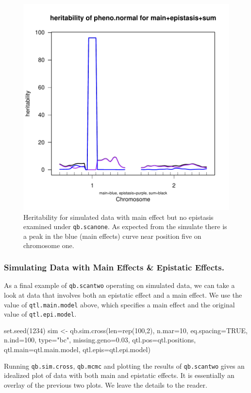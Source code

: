 \documentclass[12pt]{article}
\begin{document}
\begin{figure}
\includegraphics{scanPDF/FIG-Scanone-SimMainLog10}
\caption{Heritability for simulated data with main effect but no epistasis examined 
under {\tt qb.scanone}. As expected from the simulate there is a peak in the 
blue (main effects) curve near position five on chromosome one.}
\label{fig-simnoepimainscanone}
\end{figure}
 
\subsubsection{Simulating Data with Main Effects \& Epistatic Effects.}
As a final example of {\tt qb.scantwo} operating on simulated data, we 
can take a look at data that involves both an epistatic effect and a 
main effect.  We use the value of {\tt qtl.main.model} above, 
which specifies a main effect and the original value of 
{\tt qtl.epi.model}.
\begin{Schunk}
\begin{Sinput}
set.seed(1234)
sim <- qb.sim.cross(len=rep(100,2), n.mar=10, eq.spacing=TRUE, 
  n.ind=100, type="bc", missing.geno=0.03, qtl.pos=qtl.positions, 
  qtl.main=qtl.main.model, qtl.epis=qtl.epi.model) 
\end{Sinput}
\end{Schunk}
Running {\tt qb.sim.cross}, {\tt qb.mcmc} and plotting the results of 
{\tt qb.scantwo} gives an idealized plot of data with both main and
epistatic effects. It is essentially an overlay of the previous two
plots. We leave the details to the reader.
\end{document}

